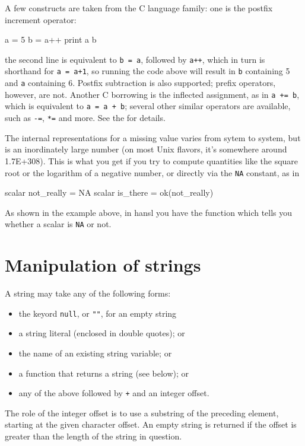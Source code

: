 A few constructs are taken from the C language family: one is the
postfix increment operator:
\begin{code}
  a = 5
  b = a++
  print a b
\end{code}
the second line is equivalent to \texttt{b = a}, followed by
\texttt{a++}, which in turn is shorthand for \texttt{a = a+1}, so
running the code above will result in \texttt{b} containing 5 and
\texttt{a} containing 6. Postfix subtraction is also supported; prefix
operators, however, are not. Another C borrowing is the inflected
assignment, as in \texttt{a += b}, which is equivalent to \texttt{a =
  a + b}; several other similar operators are available, such as
\texttt{-=}, \texttt{*=} and more. See the \GCR{} for details.

The internal representations for a missing value varies from sytem to
system, but is an inordinately large number (on most Unix flavors,
it's somewhere around 1.7E+308). This is what you get if you try to
compute quantities like the square root or the logarithm of a negative
number, or directly via the \texttt{NA} constant, as in
\begin{code}
  scalar not_really = NA
  scalar is_there = ok(not_really)
\end{code}
As shown in the example above, in hansl you have the  function
which tells you whether a scalar is \texttt{NA} or not.

\section{Manipulation of strings}

A string may take any of the following forms:
\begin{itemize}
\item the keyord \texttt{null}, or \texttt{""}, for an empty string
\item a string literal (enclosed in double quotes); or
\item the name of an existing string variable; or
\item a function that returns a string (see below); or
\item any of the above followed by \texttt{+} and an integer offset.
\end{itemize}

The role of the integer offset is to use a substring of the preceding
element, starting at the given character offset.  An empty string is
returned if the offset is greater than the length of the string in
question.

